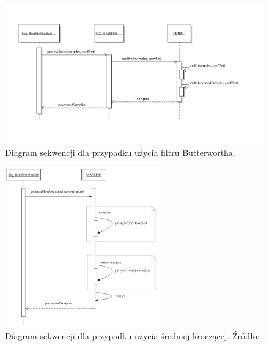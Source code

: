 \begin{figure}[H]
\centering
	\includegraphics[width=1.1\textwidth]{ECG_BASELINE/figures/butter_seq.pdf}
\caption{Diagram sekwencji dla przypadku użycia filtru Butterwortha.}
\label{MA-seq}
\end{figure}

\begin{figure}[H]
\centering
	\includegraphics[width=0.6\textwidth]{ECG_BASELINE/figures/ma_seq.pdf}
\caption{Diagram sekwencji dla przypadku użycia średniej kroczącej. Źródło: \cite{Baseline2013}}
\label{MA-seq}
\end{figure}

